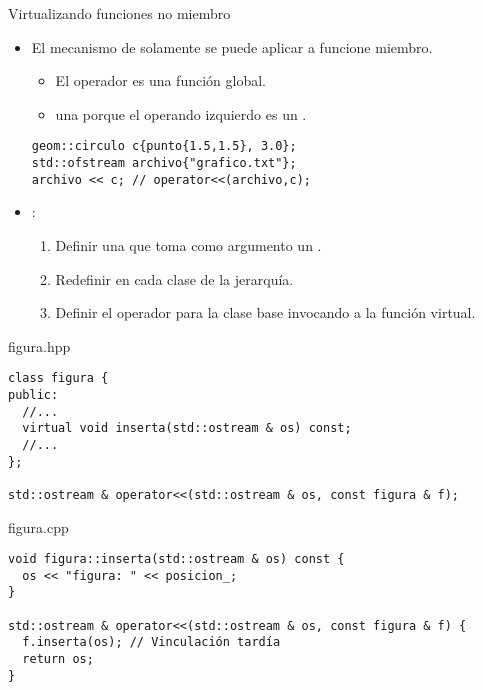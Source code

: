 \begin{frame}[t,fragile]{Virtualizando funciones no miembro}
\begin{itemize}
  \item El mecanismo de  solamente se puede
        aplicar a funcione miembro.
    \begin{itemize}
      \item El operador \cppkey{<{}<} es una función global.
      \item {} una  porque
            el operando izquierdo es un .
    \end{itemize}
\begin{lstlisting}
geom::circulo c{punto{1.5,1.5}, 3.0};
std::ofstream archivo{"grafico.txt"};
archivo << c; // operator<<(archivo,c);
\end{lstlisting}

  \item {}:
    \begin{enumerate}
      \item Definir una  
            que toma como argumento un .
      \item Redefinir  en cada clase de la jerarquía.
      \item Definir el operador \cppkey{<{}<}  para la clase base 
            invocando a la función virtual.
    \end{enumerate}

\end{itemize}
\end{frame}

\begin{frame}[t,fragile]
\begin{block}{figura.hpp}
\begin{lstlisting}
class figura {
public:
  //...
  virtual void inserta(std::ostream & os) const;
  //...
};

std::ostream & operator<<(std::ostream & os, const figura & f);
\end{lstlisting}
\end{block}

\begin{block}{figura.cpp}
\begin{lstlisting}
void figura::inserta(std::ostream & os) const {
  os << "figura: " << posicion_;
}

std::ostream & operator<<(std::ostream & os, const figura & f) {
  f.inserta(os); // Vinculación tardía
  return os;
}
\end{lstlisting}
\end{block}
\end{frame}

